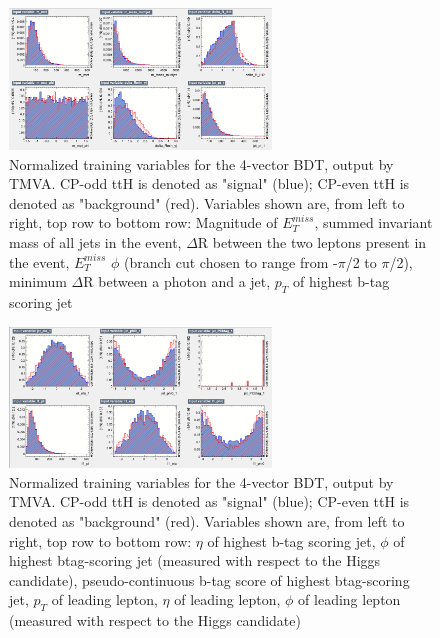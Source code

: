 \begin{figure}[htbp]
  \centering
  \includegraphics[width=0.62\textwidth]{figures/TMVABDTStudies/dilep-vbls4vec/dilep4vecvbls2.png}
  \caption{Normalized training variables for the 4-vector BDT, output by TMVA. CP-odd ttH is denoted as "signal" (blue); CP-even ttH is denoted as "background" (red). Variables shown are, from left to right, top row to bottom row: Magnitude of $E_T^{miss}$, summed invariant mass of all jets in the event, $\Delta$R between the two leptons present in the event, $E_T^{miss}$ $\phi$ (branch cut chosen to range from -$\pi$/2 to $\pi$/2), minimum $\Delta$R between a photon and a jet, $p_{T}$ of highest b-tag scoring jet}
  \label{fig:dilep4vecvbls2}
\end{figure}

\begin{figure}[htbp]
  \centering
  \includegraphics[width=0.62\textwidth]{figures/TMVABDTStudies/dilep-vbls4vec/dilep4vecvbls3.png}
  \caption{Normalized training variables for the 4-vector BDT, output by TMVA. CP-odd ttH is denoted as "signal" (blue); CP-even ttH is denoted as "background" (red). Variables shown are, from left to right, top row to bottom row: $\eta$ of highest b-tag scoring jet, $\phi$ of highest btag-scoring jet (measured with respect to the Higgs candidate), pseudo-continuous b-tag score of highest btag-scoring jet,  $p_{T}$ of leading lepton, $\eta$ of leading lepton, $\phi$ of leading lepton (measured with respect to the Higgs candidate)}
  \label{fig:dilep4vecvbls3}
\end{figure}

